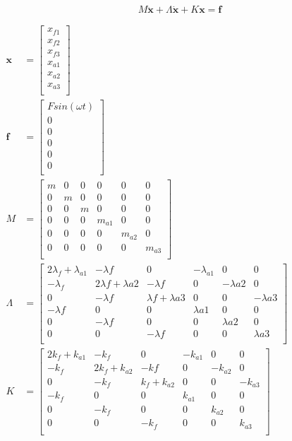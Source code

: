 \documentclass[12pt]{article}
\begin{document}
	
\begin{equation}
M\mathbf{\ddot{x}} + \Lambda\mathbf{\dot{x}} + K\mathbf{x} = \mathbf{f}
\end{equation}
	
	
\begin{math}	
\begin{aligned}
\mathbf{x} &= 
\begin{bmatrix} 
	x_{f1} \\
	x_{f2} \\
	x_{f3} \\
	x_{a1} \\
	x_{a2} \\
	x_{a3} \\
\end{bmatrix} \\
\mathbf{f} &= 
\begin{bmatrix} 
	Fsin(\omega t) \\
	0 \\
	0 \\
	0 \\
	0 \\
	0 \\
\end{bmatrix} \\	
M &=
\begin{bmatrix} 
 m & 0 & 0 & 0 & 0 & 0 \\
 0 & m & 0 & 0 & 0 & 0 \\
 0 & 0 & m & 0 & 0 & 0 \\
 0 & 0 & 0 & m_{a1} & 0 & 0 \\
 0 & 0 & 0 & 0 & m_{a2} & 0 \\
 0 & 0 & 0 & 0 & 0 & m_{a3} \\
\end{bmatrix}  \\
\Lambda &= 
\begin{bmatrix} 
 2\lambda_{f} + \lambda_{a1} & -\lambda{f} & 0 & -\lambda_{a1} & 0 & 0 \\
 -\lambda_{f} & 2\lambda{f} + \lambda{a2} & -\lambda{f} & 0 & -\lambda{a2} & 0 \\
 0 & -\lambda{f} & \lambda{f} + \lambda{a3} & 0 & 0 & -\lambda{a3} \\
 -\lambda{f} & 0 & 0 & \lambda{a1} & 0 & 0 \\
 0 & -\lambda{f} & 0 & 0 & \lambda{a2} & 0 \\
 0 & 0 & -\lambda{f} & 0 & 0 & \lambda{a3} \\
 \end{bmatrix} \\
K &= 
\begin{bmatrix} 
 2k_{f} +  k_{a1} & -k_{f} & 0 & -k_{a1} & 0 & 0 \\
 -k_{f} & 2k_{f} + k_{a2} & -k{f} & 0 & -k_{a2} & 0 \\
 0 & -k_{f} & k_{f} + k_{a2} & 0 & 0 & -k_{a3} \\
 -k_{f} & 0 & 0 & k_{a1} & 0 & 0 \\
 0 & -k_{f} & 0 & 0 & k_{a2} & 0 \\
 0 & 0 & -k_{f} & 0 & 0 & k_{a3} \\
\end{bmatrix} \\
\end{aligned}
\end{math}
\end{document}
